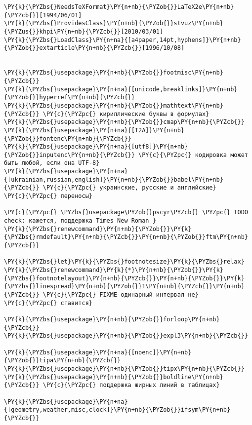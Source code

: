 \label{add:source}
\small
\begin{Verbatim}[commandchars=\\\{\}]
\PY{k}{\PYZbs{}NeedsTeXFormat}\PY{n+nb}{\PYZob{}}LaTeX2e\PY{n+nb}{\PYZcb{}}[1994/06/01]
\PY{k}{\PYZbs{}ProvidesClass}\PY{n+nb}{\PYZob{}}stvuz\PY{n+nb}{\PYZus{}}khpi\PY{n+nb}{\PYZcb{}}[2010/03/01]
\PY{k}{\PYZbs{}LoadClass}\PY{n+na}{[a4paper,14pt,hyphens]}\PY{n+nb}{\PYZob{}}extarticle\PY{n+nb}{\PYZcb{}}[1996/10/08]


\PY{k}{\PYZbs{}usepackage}\PY{n+nb}{\PYZob{}}footmisc\PY{n+nb}{\PYZcb{}}
\PY{k}{\PYZbs{}usepackage}\PY{n+na}{[unicode,breaklinks]}\PY{n+nb}{\PYZob{}}hyperref\PY{n+nb}{\PYZcb{}}
\PY{k}{\PYZbs{}usepackage}\PY{n+nb}{\PYZob{}}mathtext\PY{n+nb}{\PYZcb{}} \PY{c}{\PYZpc{} кириллические буквы в формулах}
\PY{k}{\PYZbs{}usepackage}\PY{n+nb}{\PYZob{}}cmap\PY{n+nb}{\PYZcb{}}
\PY{k}{\PYZbs{}usepackage}\PY{n+na}{[T2A]}\PY{n+nb}{\PYZob{}}fontenc\PY{n+nb}{\PYZcb{}}
\PY{k}{\PYZbs{}usepackage}\PY{n+na}{[utf8]}\PY{n+nb}{\PYZob{}}inputenc\PY{n+nb}{\PYZcb{}} \PY{c}{\PYZpc{} кодировка может быть любой, если она UTF-8}
\PY{k}{\PYZbs{}usepackage}\PY{n+na}{[ukrainian,russian,english]}\PY{n+nb}{\PYZob{}}babel\PY{n+nb}{\PYZcb{}} \PY{c}{\PYZpc{} украинские, русские и английские}
\PY{c}{\PYZpc{} переносы}

\PY{c}{\PYZpc{} \PYZbs{}usepackage\PYZob{}pscyr\PYZcb{} \PYZpc{} TODO check: кажется, поддержка Times New Roman }
\PY{k}{\PYZbs{}renewcommand}\PY{n+nb}{\PYZob{}}\PY{k}{\PYZbs{}rmdefault}\PY{n+nb}{\PYZcb{}}\PY{n+nb}{\PYZob{}}ftm\PY{n+nb}{\PYZcb{}}

\PY{k}{\PYZbs{}let}\PY{k}{\PYZbs{}footnotesize}\PY{k}{\PYZbs{}relax}
\PY{k}{\PYZbs{}renewcommand}\PY{k}{*}\PY{n+nb}{\PYZob{}}\PY{k}{\PYZbs{}footnotelayout}\PY{n+nb}{\PYZcb{}}\PY{n+nb}{\PYZob{}}\PY{k}{\PYZbs{}linespread}\PY{n+nb}{\PYZob{}}1\PY{n+nb}{\PYZcb{}}\PY{n+nb}{\PYZcb{}} \PY{c}{\PYZpc{} FIXME одинарный интервал не}
\PY{c}{\PYZpc{} ставится}

\PY{k}{\PYZbs{}usepackage}\PY{n+nb}{\PYZob{}}forloop\PY{n+nb}{\PYZcb{}}
\PY{k}{\PYZbs{}usepackage}\PY{n+nb}{\PYZob{}}expl3\PY{n+nb}{\PYZcb{}}

\PY{k}{\PYZbs{}usepackage}\PY{n+na}{[noenc]}\PY{n+nb}{\PYZob{}}tipa\PY{n+nb}{\PYZcb{}}
\PY{k}{\PYZbs{}usepackage}\PY{n+nb}{\PYZob{}}tipx\PY{n+nb}{\PYZcb{}}
\PY{k}{\PYZbs{}usepackage}\PY{n+nb}{\PYZob{}}boldline\PY{n+nb}{\PYZcb{}} \PY{c}{\PYZpc{} поддержка жирных линий в таблицах}

\PY{k}{\PYZbs{}usepackage}\PY{n+na}{[geometry,weather,misc,clock]}\PY{n+nb}{\PYZob{}}ifsym\PY{n+nb}{\PYZcb{}}


\end{Verbatim}
